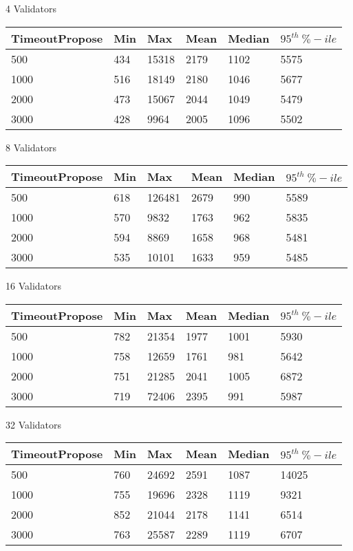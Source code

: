 4 Validators

\begin{center}
	\begin{tabular}{| l | l | l | l | l | l | }
		\hline
		TimeoutPropose & Min & Max & Mean & Median & $95^{th} \ \%-ile$ \\ \hline
		500 & 434 & 15318 & 2179 & 1102 & 5575 \\ \hline
		1000 & 516 & 18149 & 2180 & 1046 & 5677 \\ \hline
		2000 & 473 & 15067 & 2044 & 1049 & 5479 \\ \hline
		3000 & 428 & 9964 & 2005 & 1096 & 5502 \\ \hline
	\end{tabular}
\end{center}

8 Validators

\begin{center}
	\begin{tabular}{| l | l | l | l | l | l | }
		\hline
		TimeoutPropose & Min & Max & Mean & Median & $95^{th} \ \%-ile$ \\ \hline
		500 & 618 & 126481 & 2679 & 990 & 5589 \\ \hline
		1000 & 570 & 9832 & 1763 & 962 & 5835 \\ \hline
		2000 & 594 & 8869 & 1658 & 968 & 5481 \\ \hline
		3000 & 535 & 10101 & 1633 & 959 & 5485 \\ \hline
	\end{tabular}
\end{center}

16 Validators

\begin{center}
	\begin{tabular}{| l | l | l | l | l | l | }
		\hline
		TimeoutPropose & Min & Max & Mean & Median & $95^{th} \ \%-ile$ \\ \hline
		500 & 782 & 21354 & 1977 & 1001 & 5930 \\ \hline
		1000 & 758 & 12659 & 1761 & 981 & 5642 \\ \hline
		2000 & 751 & 21285 & 2041 & 1005 & 6872 \\ \hline
		3000 & 719 & 72406 & 2395 & 991 & 5987 \\ \hline
	\end{tabular}
\end{center}

32 Validators

\begin{center}
	\begin{tabular}{| l | l | l | l | l | l | }
		\hline
		TimeoutPropose & Min & Max & Mean & Median & $95^{th} \ \%-ile$ \\ \hline
		500 & 760 & 24692 & 2591 & 1087 & 14025 \\ \hline
		1000 & 755 & 19696 & 2328 & 1119 & 9321 \\ \hline
		2000 & 852 & 21044 & 2178 & 1141 & 6514 \\ \hline
		3000 & 763 & 25587 & 2289 & 1119 & 6707 \\ \hline
	\end{tabular}
\end{center}


